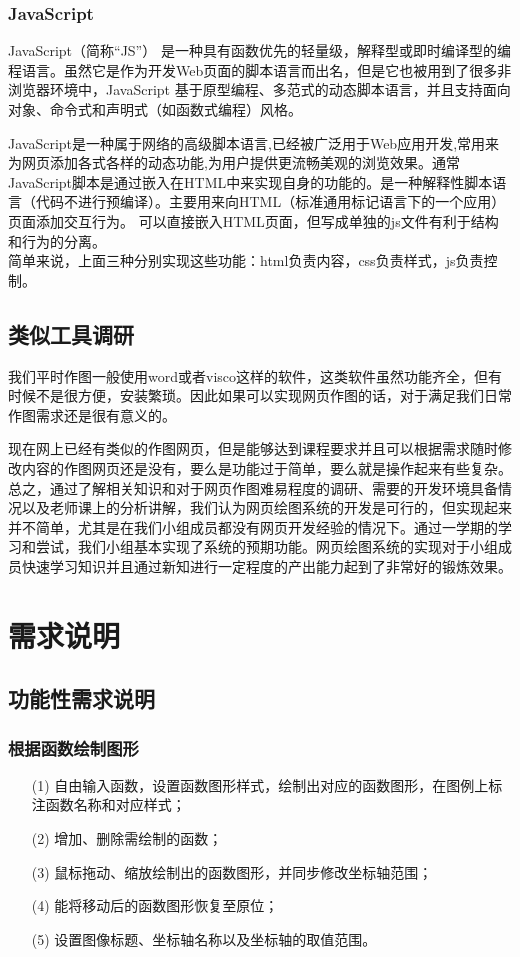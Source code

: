 \documentclass[lang=cn]{elegantpaper}
\begin{document}
\subsubsection{JavaScript}
JavaScript（简称“JS”） 是一种具有函数优先的轻量级，解释型或即时编译型的编程语言。虽然它是作为开发Web页面的脚本语言而出名，但是它也被用到了很多非浏览器环境中，JavaScript 基于原型编程、多范式的动态脚本语言，并且支持面向对象、命令式和声明式（如函数式编程）风格。

JavaScript是一种属于网络的高级脚本语言,已经被广泛用于Web应用开发,常用来为网页添加各式各样的动态功能,为用户提供更流畅美观的浏览效果。通常JavaScript脚本是通过嵌入在HTML中来实现自身的功能的。是一种解释性脚本语言（代码不进行预编译）。主要用来向HTML（标准通用标记语言下的一个应用）页面添加交互行为。 可以直接嵌入HTML页面，但写成单独的js文件有利于结构和行为的分离。\\


简单来说，上面三种分别实现这些功能：html负责内容，css负责样式，js负责控制。


\subsection{类似工具调研}

我们平时作图一般使用word或者visco这样的软件，这类软件虽然功能齐全，但有时候不是很方便，安装繁琐。因此如果可以实现网页作图的话，对于满足我们日常作图需求还是很有意义的。

现在网上已经有类似的作图网页，但是能够达到课程要求并且可以根据需求随时修改内容的作图网页还是没有，要么是功能过于简单，要么就是操作起来有些复杂。\\


总之，通过了解相关知识和对于网页作图难易程度的调研、需要的开发环境具备情况以及老师课上的分析讲解，我们认为网页绘图系统的开发是可行的，但实现起来并不简单，尤其是在我们小组成员都没有网页开发经验的情况下。通过一学期的学习和尝试，我们小组基本实现了系统的预期功能。网页绘图系统的实现对于小组成员快速学习知识并且通过新知进行一定程度的产出能力起到了非常好的锻炼效果。

\section{需求说明}
\subsection{功能性需求说明}

\subsubsection{根据函数绘制图形}
\begin{itemize}
	\item [(1)]自由输入函数，设置函数图形样式，绘制出对应的函数图形，在图例上标注函数名称和对应样式；
	\item [(2)]增加、删除需绘制的函数；
	\item [(3)]鼠标拖动、缩放绘制出的函数图形，并同步修改坐标轴范围；
	\item [(4)]能将移动后的函数图形恢复至原位；
	\item [(5)]设置图像标题、坐标轴名称以及坐标轴的取值范围。
\end{itemize}
\end{document}
